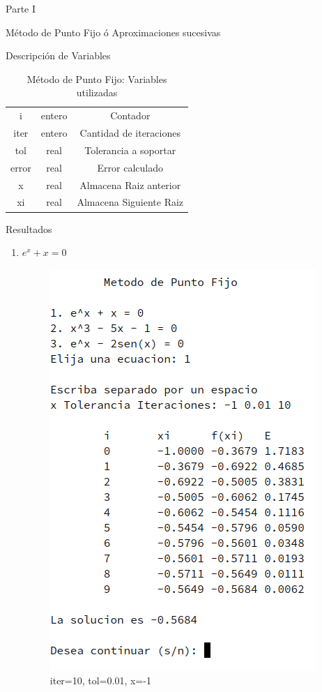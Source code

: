 \documentclass[legalpaper, 12pt]{article}
\def \eqa {\(e^x + x = 0\)}
\begin{document}
\begin{section}{Parte I}
\begin{subsection}{Método de Punto Fijo ó Aproximaciones sucesivas}
\begin{subsubsection}{Descripción de Variables}
\begin{table}[h]
\begin{tabular}{|c c c|}
            i & entero & Contador \\
            iter & entero & Cantidad de iteraciones \\
            tol & real & Tolerancia a soportar \\
            error & real & Error calculado \\
            x & real & Almacena Raiz anterior\\
            xi & real & Almacena Siguiente Raiz\\
            \hline
          \end{tabular}
          \caption{Método de Punto Fijo: Variables utilizadas}
        \end{table}
      \end{subsubsection}
      \newpage
      \begin{subsubsection}{Resultados}
        \begin{enumerate}
          \item \eqa
          \begin{figure}[h]
            \centering
            \includegraphics[scale=0.72]{pto1.png}
            \caption{iter=10, tol=0.01, x=-1}
          \end{figure}

\end{enumerate}
\end{subsubsection}
\end{subsection}
\end{section}
\end{document}
